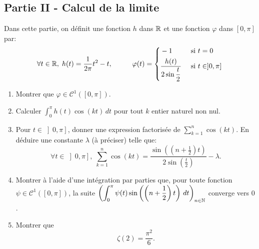\subsection*{Partie II - Calcul de la limite}
Dans cette partie, on définit une fonction $h$ dans $\mathbb{R}$ et une fonction $\varphi$ dans $[0,\pi]$ par:
\begin{displaymath}
 \forall t\in \mathbb{R},\;h(t)=\frac{1}{2\pi}t^2 -t,
\hspace{1cm} \varphi(t)=
\left\lbrace
\begin{aligned}
 &-1 &\text{ si }& t=0\\
 &\frac{h(t)}{2\sin \displaystyle \frac{t}{2}} &\text{ si }& t\in ]0,\pi ]
\end{aligned}
\right.
\end{displaymath}
\begin{enumerate}
 \item Montrer que $\varphi\in \mathcal C^{1}(\left[ 0,\pi\right] )$.
 \item Calculer $\displaystyle \int_0^\pi h(t)\cos(kt)\,dt$ pour tout $k$ entier naturel non nul.
 \item Pour $t\in \left] 0,\pi\right]$, donner une expression factorisée de $\displaystyle \sum_{k=1}^n\cos(kt)$. En déduire une constante $\lambda$ (à préciser) telle que:
\begin{displaymath}
 \forall t\in \left] 0,\pi\right],\;
\sum_{k=1}^n\cos(kt)=
\frac{\displaystyle \sin\left(\left(n+\frac{1}{2}\right)t \right) }{\displaystyle 2\sin \left(\frac{t}{2}\right)} -\lambda.
\end{displaymath}
\item Montrer à l'aide d'une intégration par parties que, pour toute fonction $\psi\in \mathcal C^1(\left[0,\pi\right])$, la suite $\displaystyle \left( \int_0^\pi\psi(t)\sin\left( \left(n+\frac{1}{2}\right)t\right)\,dt \right) _{n\in \mathbb{N}}$ converge vers $0$.
\item Montrer que
\begin{displaymath}
 \zeta(2)=\frac{\pi^2}{6}.
\end{displaymath}

\end{enumerate}

